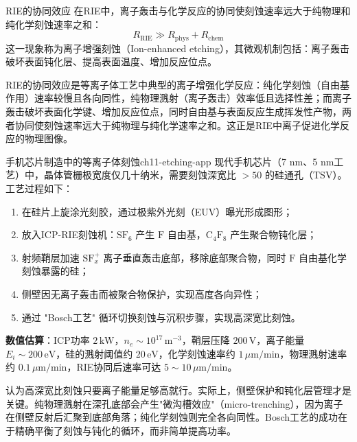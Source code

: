 \documentclass[12pt,a4paper,openany,oneside]{book}
\newcommand{\difficulty}[1]{\marginnote{\hfill\textcolor{coverMid!80}{\rule[-0.1em]{2pt}{0.9em}}\,\textcolor{coverMid}{\footnotesize\textbf{[#1]}}}}
\begin{document}
\begin{theorem}{RIE的协同效应}{}{}
\label{thm:rie-synergy}
在RIE中，离子轰击与化学反应的协同使刻蚀速率远大于纯物理和纯化学刻蚀速率之和：
\begin{equation}
\label{eq:rie-synergy}
R_{\text{RIE}} \gg R_{\text{phys}} + R_{\text{chem}}
\end{equation}
这一现象称为离子增强刻蚀（Ion-enhanced etching），其微观机制包括：离子轰击破坏表面钝化层、提高表面温度、增加反应位点。
\end{theorem}

\begin{insight}{}{}
RIE的协同效应是等离子体工艺中典型的离子增强化学反应：纯化学刻蚀（自由基作用）速率较慢且各向同性，纯物理溅射（离子轰击）效率低且选择性差；而离子轰击破坏表面化学键、增加反应位点，同时自由基与表面反应生成挥发性产物，两者协同使刻蚀速率远大于纯物理与纯化学速率之和。这正是RIE中离子促进化学反应的物理图像。
\end{insight}

\begin{example}{手机芯片制造中的等离子体刻蚀}{ch11-etching-app}
\label{ex:chip-etching}
\difficulty{提高}
现代手机芯片（7 nm、5 nm工艺）中，晶体管栅极宽度仅几十纳米，需要刻蚀深宽比 $> 50$ 的硅通孔（TSV）。工艺过程如下：
\begin{enumerate}
\item 在硅片上旋涂光刻胶，通过极紫外光刻（EUV）曝光形成图形；
\item 放入ICP-RIE刻蚀机：$\mathrm{SF}_6$ 产生 $\mathrm{F}$ 自由基，$\mathrm{C}_4\mathrm{F}_8$ 产生聚合物钝化层；
\item 射频鞘层加速 $\mathrm{SF}_x^+$ 离子垂直轰击底部，移除底部聚合物，同时 $\mathrm{F}$ 自由基化学刻蚀暴露的硅；
\item 侧壁因无离子轰击而被聚合物保护，实现高度各向异性；
\item 通过 "Bosch工艺" 循环切换刻蚀与沉积步骤，实现高深宽比刻蚀。
\end{enumerate}
\textbf{数值估算}：ICP功率 $2\,\mathrm{kW}$，$n_e \sim 10^{17}\,\mathrm{m^{-3}}$，鞘层压降 $200\,\mathrm{V}$，离子能量 $E_i \sim 200\,\mathrm{eV}$，硅的溅射阈值约 $20\,\mathrm{eV}$，化学刻蚀速率约 $1\,\mu\mathrm{m}/\mathrm{min}$，物理溅射速率约 $0.1\,\mu\mathrm{m}/\mathrm{min}$，RIE协同后速率可达 $5\sim 10\,\mu\mathrm{m}/\mathrm{min}$。
\end{example}

\begin{warning}{}{}
认为高深宽比刻蚀只要离子能量足够高就行。实际上，侧壁保护和钝化层管理才是关键。纯物理溅射在深孔底部会产生"微沟槽效应"（micro-trenching），因为离子在侧壁反射后汇聚到底部角落；纯化学刻蚀则完全各向同性。Bosch工艺的成功在于精确平衡了刻蚀与钝化的循环，而非简单提高功率。
\end{warning}
\end{document}
